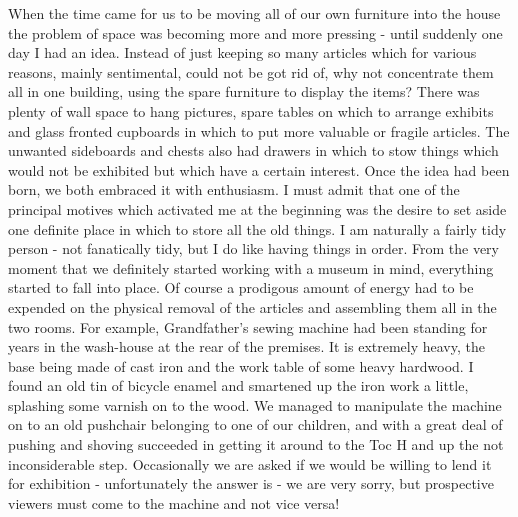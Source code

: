When the time came for us to be moving all of our own furniture into the house the problem of space was becoming more and more pressing - until suddenly one day I had an idea. Instead of just keeping so many articles which for various reasons, mainly sentimental, could not be got rid of, why not concentrate them all in one building, using the spare furniture to display the items? There was plenty of wall space to hang pictures, spare tables on which to arrange exhibits and glass fronted cupboards in which to put more valuable or fragile articles. The unwanted sideboards and chests also had drawers in which to stow things which would not be exhibited but which have a certain interest. Once the idea had been born, we both embraced it with enthusiasm. I must admit that one of the principal motives which activated me at the beginning was the desire to set aside one definite place in which to store all the old things. I am naturally a fairly tidy person - not fanatically tidy, but I do like having things in order. From the very moment that we definitely started working with a museum in mind, everything started to fall into place. Of course a prodigous amount of energy had to be expended on the physical removal of the articles and assembling them all in the two rooms. For example, Grandfather's sewing machine had been standing for years in the wash-house at the rear of the premises. It is extremely heavy, the base being made of cast iron and the work table of some heavy hardwood. I found an old tin of bicycle enamel and smartened up the iron work a little, splashing some varnish on to the wood. We managed to manipulate the machine on to an old pushchair belonging to one of our children, and with a great deal of pushing and shoving succeeded in getting it around to the Toc H and up the not inconsiderable step. Occasionally we are asked if we would be willing to lend it for exhibition - unfortunately the answer is  - we are very sorry, but prospective viewers must come to the machine and not vice versa!

